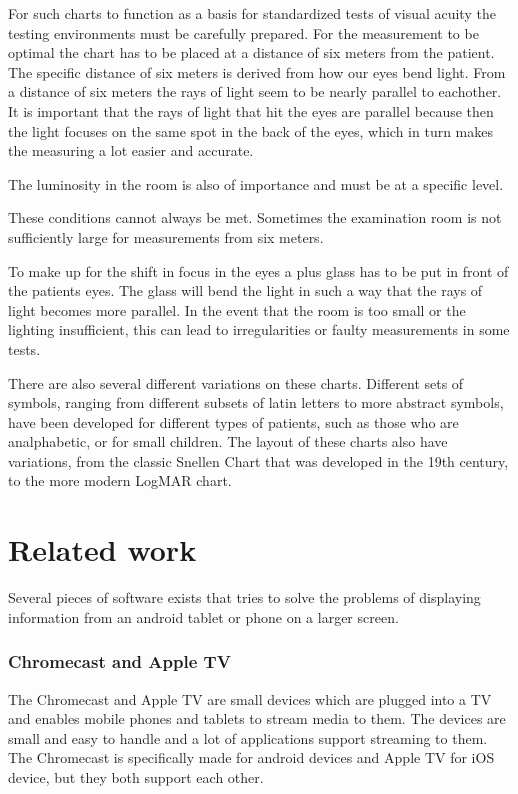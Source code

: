 \documentclass[12pt,a4paper,notitlepage]{report}
\begin{document}
For such charts to function as a basis for standardized tests of visual acuity the testing environments must be carefully prepared. For the measurement to be optimal the chart has to be placed at a distance of six meters from the patient. The specific distance of six meters is derived from how our eyes bend light. From a distance of six meters the rays of light seem to be nearly parallel to eachother. %
It is important that the rays of light that hit the eyes are parallel because then the light focuses on the same spot in the back of the eyes, which in turn makes the measuring a lot easier and accurate.

The luminosity in the room is also of importance and must be at a specific level. 

These conditions cannot always be met. Sometimes the examination room is not sufficiently large for measurements from six meters. %

To make up for the shift in focus in the eyes a plus glass has to be put in front of the patients eyes. The glass will bend the light in such a way that the rays of light becomes more parallel. In the event that the room is too small or the lighting insufficient, this can lead to irregularities or faulty measurements in some tests. 

There are also several different variations on these charts. Different sets of symbols, ranging from different subsets of latin letters to more abstract symbols, have been developed for different types of patients, such as those who are analphabetic, or for small children. The layout of these charts also have variations, from the classic Snellen Chart that was developed in the 19th century, to the more modern LogMAR chart.

\section{Related work}
Several pieces of software exists that tries to solve the problems of displaying information from an android tablet or phone on a larger screen. 

\subsubsection{Chromecast and Apple TV}
The Chromecast \cite{chromecast} and Apple TV \cite{appletv} are small devices which are plugged into a TV and enables mobile phones and tablets to stream media to them. The devices are small and easy to handle and a lot of applications support streaming to them. The Chromecast is specifically made for android devices and Apple TV for iOS device, but they both support each other.
\end{document}

